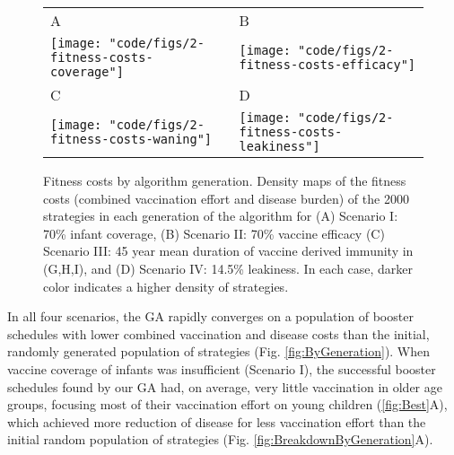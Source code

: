 \documentclass[12pt]{article}
\begin{document}
\begin{figure}[h!]

\begin{tabular}{ll}
A&B\\
\texttt{[image: "code/figs/2-fitness-costs-coverage"]} &
\texttt{[image: "code/figs/2-fitness-costs-efficacy"]} \\
C&D\\
\texttt{[image: "code/figs/2-fitness-costs-waning"]} &
\texttt{[image: "code/figs/2-fitness-costs-leakiness"]} \\
\end{tabular}

\caption{\footnotesize Fitness costs by algorithm generation. 
Density maps of the fitness costs (combined vaccination effort and disease burden)
of the 2000 strategies in each generation of the algorithm for
(A) Scenario I: 70\% infant coverage,
(B) Scenario II: 70\% vaccine efficacy
(C) Scenario III: 45 year mean duration of vaccine derived immunity in (G,H,I),
and 
(D) Scenario IV: 14.5\% leakiness.
In each case, darker color indicates a higher density of strategies.
}
\end{figure}


In all four scenarios, the GA rapidly converges on a population of booster schedules
with lower combined vaccination and disease costs than the initial, randomly generated
population of strategies (Fig. \ref{fig:ByGeneration}).
When vaccine coverage of infants was insufficient (Scenario I),
the successful booster schedules found by our GA had, on average,
very little vaccination in older age groups, focusing most of their vaccination effort on 
young children (\ref{fig:Best}A), which
achieved more reduction of disease for less vaccination effort 
than the initial random population of strategies
 (Fig. \ref{fig:BreakdownByGeneration}A). 
 
 
\end{document}
